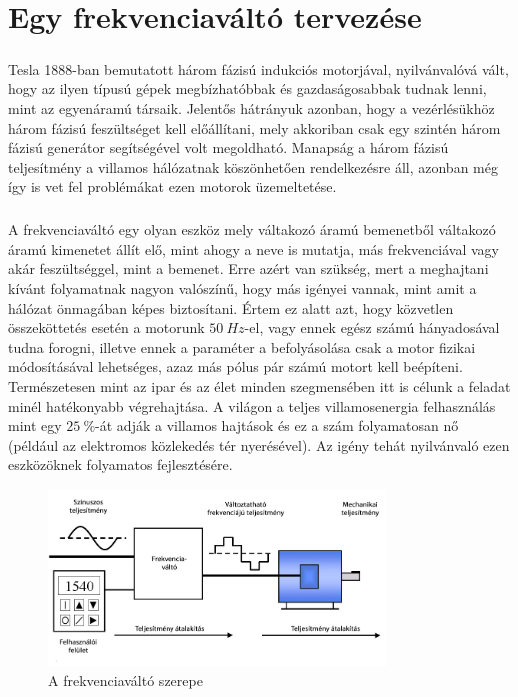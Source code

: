 \chapter{Egy frekvenciaváltó tervezése}

\paragraph{}
Tesla 1888-ban bemutatott három fázisú indukciós motorjával, nyilvánvalóvá vált, hogy az ilyen típusú gépek megbízhatóbbak és gazdaságosabbak tudnak lenni, mint az egyenáramú társaik. Jelentős hátrányuk azonban, hogy a vezérlésükhöz három fázisú feszültséget kell előállítani, mely akkoriban csak egy szintén három fázisú generátor segítségével volt megoldható. Manapság a három fázisú teljesítmény a villamos hálózatnak köszönhetően rendelkezésre áll, azonban még így is vet fel problémákat ezen motorok üzemeltetése.

\paragraph{}
A frekvenciaváltó egy olyan eszköz mely váltakozó áramú bemenetből váltakozó áramú kimenetet állít elő, mint ahogy a neve is mutatja, más frekvenciával vagy akár feszültséggel, mint a bemenet. Erre azért van szükség, mert a meghajtani kívánt folyamatnak nagyon valószínű, hogy más igényei vannak, mint amit a hálózat önmagában képes biztosítani. Értem ez alatt azt, hogy közvetlen összeköttetés esetén a motorunk $50\ Hz$-el, vagy ennek egész számú hányadosával tudna forogni, illetve ennek a paraméter a befolyásolása csak a motor fizikai módosításával lehetséges, azaz más pólus pár számú motort kell beépíteni. Természetesen mint az ipar és az élet minden szegmensében itt is célunk a feladat minél hatékonyabb végrehajtása. A világon a teljes villamosenergia felhasználás mint egy $25\ \%$-át adják a villamos hajtások és ez a szám folyamatosan nő (például az elektromos közlekedés tér nyerésével). Az igény tehát nyilvánvaló ezen eszközöknek folyamatos fejlesztésére.

\begin{figure}[!h]
	\centering
	\includegraphics[width = 0.8\textwidth]{figures/VFD_System.jpg}
	\caption{A frekvenciaváltó szerepe} 
	\label{fig:vfd_system}
\end{figure}

